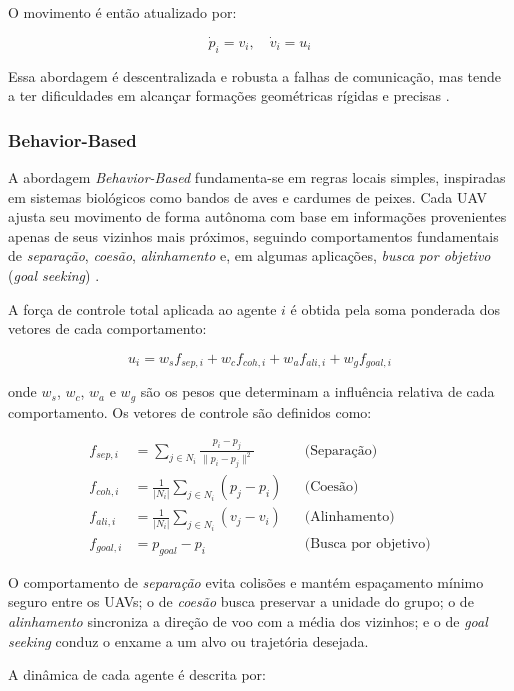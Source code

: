 \documentclass[portuguese]{sbcreviews-2025}%
\begin{document}
O movimento é então atualizado por:

\[
\dot{p}_i = v_i, \quad \dot{v}_i = u_i
\]

Essa abordagem é descentralizada e robusta a falhas de comunicação, mas tende a ter dificuldades em alcançar formações geométricas rígidas e precisas \cite{bu2024advancement, ouyang2023formation}.


\subsubsection{Behavior-Based}

A abordagem \textit{Behavior-Based} fundamenta-se em regras locais simples, inspiradas em sistemas biológicos como bandos de aves e cardumes de peixes. Cada UAV ajusta seu movimento de forma autônoma com base em informações provenientes apenas de seus vizinhos mais próximos, seguindo comportamentos fundamentais de \textit{separação}, \textit{coesão}, \textit{alinhamento} e, em algumas aplicações, \textit{busca por objetivo} (\textit{goal seeking}) \cite{ouyang2023formation, reynolds1987flocks}.

A força de controle total aplicada ao agente $i$ é obtida pela soma ponderada dos vetores de cada comportamento:

\[
u_i = w_s f_{sep,i} + w_c f_{coh,i} + w_a f_{ali,i} + w_g f_{goal,i}
\]

onde $w_s$, $w_c$, $w_a$ e $w_g$ são os pesos que determinam a influência relativa de cada comportamento. Os vetores de controle são definidos como:

\[
\begin{aligned}
f_{sep,i} &= \sum_{j \in N_i} \frac{p_i - p_j}{\|p_i - p_j\|^2} && \text{(Separação)} \\[6pt]
f_{coh,i} &= \frac{1}{|N_i|}\sum_{j \in N_i}(p_j - p_i) && \text{(Coesão)} \\[6pt]
f_{ali,i} &= \frac{1}{|N_i|}\sum_{j \in N_i}(v_j - v_i) && \text{(Alinhamento)} \\[6pt]
f_{goal,i} &= p_{goal} - p_i && \text{(Busca por objetivo)}
\end{aligned}
\]

O comportamento de \textit{separação} evita colisões e mantém espaçamento mínimo seguro entre os UAVs; o de \textit{coesão} busca preservar a unidade do grupo; o de \textit{alinhamento} sincroniza a direção de voo com a média dos vizinhos; e o de \textit{goal seeking} conduz o enxame a um alvo ou trajetória desejada.

A dinâmica de cada agente é descrita por:
\end{document}

